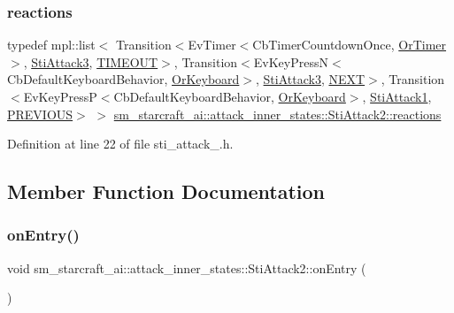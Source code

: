 \subsubsection{\texorpdfstring{reactions}{reactions}}
{\footnotesize\ttfamily typedef mpl\+::list$<$ Transition$<$Ev\+Timer$<$Cb\+Timer\+Countdown\+Once, \hyperlink{classsm__starcraft__ai_1_1OrTimer}{Or\+Timer}$>$, \hyperlink{structsm__starcraft__ai_1_1attack__inner__states_1_1StiAttack3}{Sti\+Attack3}, \hyperlink{structsm__starcraft__ai_1_1attack__inner__states_1_1StiAttack2_1_1TIMEOUT}{T\+I\+M\+E\+O\+UT}$>$, Transition$<$Ev\+Key\+PressN$<$Cb\+Default\+Keyboard\+Behavior, \hyperlink{classsm__starcraft__ai_1_1OrKeyboard}{Or\+Keyboard}$>$, \hyperlink{structsm__starcraft__ai_1_1attack__inner__states_1_1StiAttack3}{Sti\+Attack3}, \hyperlink{structsm__starcraft__ai_1_1attack__inner__states_1_1StiAttack2_1_1NEXT}{N\+E\+XT}$>$, Transition$<$Ev\+Key\+PressP$<$Cb\+Default\+Keyboard\+Behavior, \hyperlink{classsm__starcraft__ai_1_1OrKeyboard}{Or\+Keyboard}$>$, \hyperlink{structsm__starcraft__ai_1_1attack__inner__states_1_1StiAttack1}{Sti\+Attack1}, \hyperlink{structsm__starcraft__ai_1_1attack__inner__states_1_1StiAttack2_1_1PREVIOUS}{P\+R\+E\+V\+I\+O\+US}$>$ $>$ \hyperlink{structsm__starcraft__ai_1_1attack__inner__states_1_1StiAttack2_a978f087e297634bc2e93830ee485a799}{sm\+\_\+starcraft\+\_\+ai\+::attack\+\_\+inner\+\_\+states\+::\+Sti\+Attack2\+::reactions}}



Definition at line 22 of file sti\+\_\+attack\+\_.\+h.



\subsection{Member Function Documentation}
\mbox{\label{structsm__starcraft__ai_1_1attack__inner__states_1_1StiAttack2_aaf86dde2442f2d91ffeae296f74c6120}} 
\subsubsection{\texorpdfstring{on\+Entry()}{onEntry()}}
{\footnotesize\ttfamily void sm\+\_\+starcraft\+\_\+ai\+::attack\+\_\+inner\+\_\+states\+::\+Sti\+Attack2\+::on\+Entry (\begin{DoxyParamCaption}{ }\end{DoxyParamCaption})\hspace{0.3cm}{\ttfamily [inline]}}



